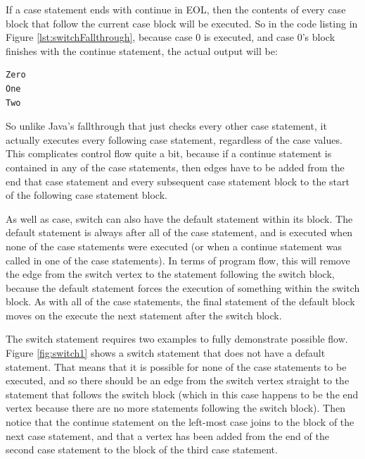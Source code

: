 If a case statement ends with continue in EOL, then the contents of every case block that follow the current case block will be executed. So in the code listing in Figure \ref{lst:switchFallthrough}, because case 0 is executed, and case 0's block finishes with the continue statement, the actual output will be:

\begin{verbatim}
Zero
One
Two
\end{verbatim}

So unlike Java's fallthrough that just checks every other case statement, it actually executes every following case statement, regardless of the case values. This complicates control flow quite a bit, because if a continue statement is contained in any of the case statements, then edges have to be added from the end that case statement and every subsequent case statement block to the start of the following case statement block.

As well as case, switch can also have the default statement within its block. The default statement is always after all of the case statement, and is executed when none of the case statements were executed (or when a continue statement was called in one of the case statements). In terms of program flow, this will remove the edge from the switch vertex to the statement following the switch block, because the default statement forces the execution of something within the switch block. As with all of the case statements, the final statement of the default block moves on the execute the next statement after the switch block.

The switch statement requires two examples to fully demonstrate possible flow. Figure \ref{fig:switch1} shows a switch statement that does not have a default statement. That means that it is possible for none of the case statements to be executed, and so there should be an edge from the switch vertex straight to the statement that follows the switch block (which in this case happens to be the end vertex because there are no more statements following the switch block). Then notice that the continue statement on the left-most case joins to the block of the next case statement, and that a vertex has been added from the end of the second case statement to the block of the third case statement.

